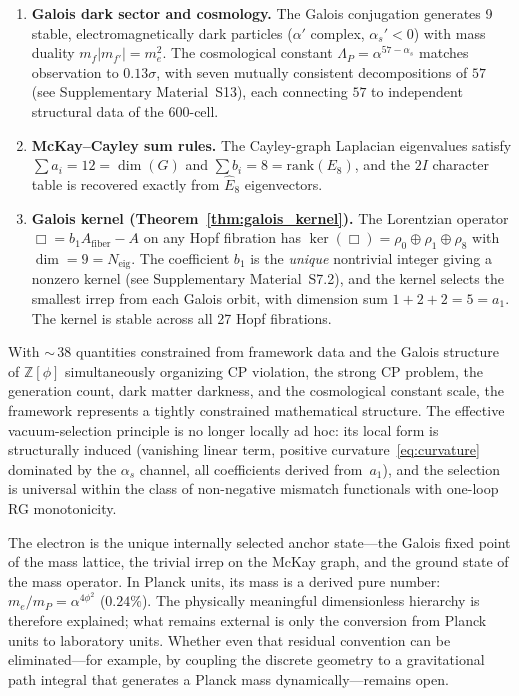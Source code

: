 \documentclass[12pt,a4paper]{article}
\theoremstyle{definition}
\begin{document}
\begin{enumerate}
\item \textbf{Galois dark sector and cosmology.}  The Galois conjugation generates 9 stable, electromagnetically dark particles ($\alpha'$ complex, $\alpha_s' < 0$) with mass duality $m_f |m_{f'}| = m_e^2$.  The cosmological constant $\Lambda_P = \alpha^{57-\alpha_s}$ matches observation to $0.13\sigma$, with seven mutually consistent decompositions of $57$ (see Supplementary Material~S13), each connecting $57$ to independent structural data of the 600-cell.

\item \textbf{McKay--Cayley sum rules.}  The Cayley-graph Laplacian eigenvalues satisfy $\sum a_i = 12 = \dim(G)$ and $\sum b_i = 8 = \text{rank}(E_8)$, and the $2I$ character table is recovered exactly from $\hat{E}_8$ eigenvectors.

\item \textbf{Galois kernel (Theorem~\ref{thm:galois_kernel}).}  The Lorentzian operator $\Box = b_1 A_{\text{fiber}} - A$ on any Hopf fibration has $\ker(\Box) = \rho_0 \oplus \rho_1 \oplus \rho_8$ with $\dim = 9 = N_{\text{eig}}$.  The coefficient $b_1$ is the \emph{unique} nontrivial integer giving a nonzero kernel (see Supplementary Material~S7.2), and the kernel selects the smallest irrep from each Galois orbit, with dimension sum $1 + 2 + 2 = 5 = a_1$.  The kernel is stable across all 27 Hopf fibrations.
\end{enumerate}

With ${\sim}\,38$ quantities constrained from framework data and the Galois structure of $\mathbb{Z}[\phi]$ simultaneously organizing CP violation, the strong CP problem, the generation count, dark matter darkness, and the cosmological constant scale, the framework represents a tightly constrained mathematical structure.  The effective vacuum-selection principle is no longer locally ad hoc: its local form is structurally induced (vanishing linear term, positive curvature~\eqref{eq:curvature} dominated by the $\alpha_s$ channel, all coefficients derived from~$a_1$), and the selection is universal within the class of non-negative mismatch functionals with one-loop RG monotonicity.

The electron is the unique internally selected anchor state---the Galois fixed point of the mass lattice, the trivial irrep on the McKay graph, and the ground state of the mass operator.  In Planck units, its mass is a derived pure number: $m_e/m_P = \alpha^{4\phi^2}$ ($0.24\%$).  The physically meaningful dimensionless hierarchy is therefore explained; what remains external is only the conversion from Planck units to laboratory units.  Whether even that residual convention can be eliminated---for example, by coupling the discrete geometry to a gravitational path integral that generates a Planck mass dynamically---remains open.
\end{document}
